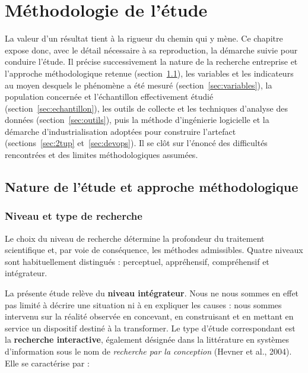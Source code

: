 \chapter{Méthodologie de l'étude}
\label{chap:methodo}

\introchap

La valeur d'un résultat tient à la rigueur du chemin qui y mène. Ce chapitre
expose donc, avec le détail nécessaire à sa reproduction, la démarche suivie
pour conduire l'étude. Il précise successivement la nature de la recherche
entreprise et l'approche méthodologique retenue (section~\ref{sec:nature}), les
variables et les indicateurs au moyen desquels le phénomène a été mesuré
(section~\ref{sec:variables}), la population concernée et l'échantillon
effectivement étudié (section~\ref{sec:echantillon}), les outils de collecte et
les techniques d'analyse des données (section~\ref{sec:outils}), puis la méthode
d'ingénierie logicielle et la démarche d'industrialisation adoptées pour
construire l'artefact (sections~\ref{sec:2tup} et~\ref{sec:devops}). Il se clôt
sur l'énoncé des difficultés rencontrées et des limites méthodologiques
assumées.

\section{Nature de l'étude et approche méthodologique}
\label{sec:nature}

\subsection{Niveau et type de recherche}

Le choix du niveau de recherche détermine la profondeur du traitement
scientifique et, par voie de conséquence, les méthodes admissibles. Quatre
niveaux sont habituellement distingués : perceptuel, appréhensif, compréhensif
et intégrateur.

La présente étude relève du \textbf{niveau intégrateur}. Nous ne nous sommes en
effet pas limité à décrire une situation ni à en expliquer les causes : nous
sommes intervenu sur la réalité observée en concevant, en construisant et en
mettant en service un dispositif destiné à la transformer. Le type d'étude
correspondant est la \textbf{recherche interactive}, également désignée dans la
littérature en systèmes d'information sous le nom de \emph{recherche par la
conception} (Hevner et al., 2004). Elle se caractérise par :

